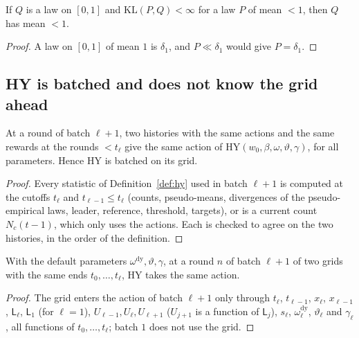 \documentclass[11pt]{article}
\newcommand{\KL}{\mathrm{KL}}
\begin{document}
\begin{lemma}\label{flem:mean-lt-one}
If $Q$ is a law on $[0,1]$ and $\KL(P,Q)<\infty$ for a law $P$ of mean $<1$, then $Q$ has mean
$<1$.
\end{lemma}

\begin{proof}
A law on $[0,1]$ of mean $1$ is $\delta_1$, and $P\ll\delta_1$ would give $P=\delta_1$.
\end{proof}

\subsection{HY is batched and does not know the grid ahead}

\begin{lemma}\label{flem:hy-congr}
At a round of batch $\ell+1$, two histories with the same actions and the same rewards at the
rounds $<t_\ell$ give the same action of HY$(w_0,\beta,\omega,\vartheta,\gamma)$, for all
parameters. Hence HY is batched on its grid.
\end{lemma}

\begin{proof}
Every statistic of Definition~\ref{def:hy} used in batch $\ell+1$ is computed at the cutoffs
$t_\ell$ and $t_{\ell-1}\le t_\ell$ (counts, pseudo-means, divergences of the pseudo-empirical laws,
leader, reference, threshold, targets), or is a current count $N_c(t-1)$, which only uses the
actions. Each is checked to agree on the two histories, in the order of the definition.
\end{proof}

\begin{lemma}\label{flem:hy-grid}
With the default parameters $\omega^{\mathrm{dy}},\vartheta,\gamma$, at a round $n$ of batch
$\ell+1$ of two grids with the same ends $t_0,\dots,t_\ell$, HY takes the same action.
\end{lemma}

\begin{proof}
The grid enters the action of batch $\ell+1$ only through $t_\ell$, $t_{\ell-1}$, $x_\ell$,
$x_{\ell-1}$, $\mathsf L_\ell$, $\mathsf L_1$ (for $\ell=1$), $U_{\ell-1},U_\ell,U_{\ell+1}$
($U_{j+1}$ is a function of $\mathsf L_j$), $s_\ell$, $\omega^{\mathrm{dy}}_\ell$, $\vartheta_\ell$ and
$\gamma_\ell$, all functions of $t_0,\dots,t_\ell$; batch $1$ does not use the grid.
\end{proof}
\end{document}

